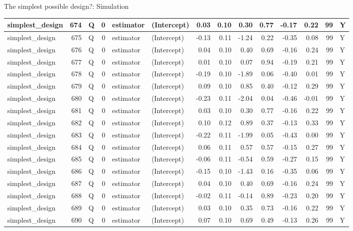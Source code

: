 \documentclass[
  11pt,
  ignorenonframetext,
]{beamer}
\begin{document}
\begin{frame}[fragile]{The simplest possible design?: Simulation}
\begin{tabular}{l|r|l|r|l|l|r|r|r|r|r|r|r|l}
\hline
simplest\_design & 674 & Q & 0 & estimator & (Intercept) & 0.03 & 0.10 & 0.30 & 0.77 & -0.17 & 0.22 & 99 & Y\\
\hline
simplest\_design & 675 & Q & 0 & estimator & (Intercept) & -0.13 & 0.11 & -1.24 & 0.22 & -0.35 & 0.08 & 99 & Y\\
\hline
simplest\_design & 676 & Q & 0 & estimator & (Intercept) & 0.04 & 0.10 & 0.40 & 0.69 & -0.16 & 0.24 & 99 & Y\\
\hline
simplest\_design & 677 & Q & 0 & estimator & (Intercept) & 0.01 & 0.10 & 0.07 & 0.94 & -0.19 & 0.21 & 99 & Y\\
\hline
simplest\_design & 678 & Q & 0 & estimator & (Intercept) & -0.19 & 0.10 & -1.89 & 0.06 & -0.40 & 0.01 & 99 & Y\\
\hline
simplest\_design & 679 & Q & 0 & estimator & (Intercept) & 0.09 & 0.10 & 0.85 & 0.40 & -0.12 & 0.29 & 99 & Y\\
\hline
simplest\_design & 680 & Q & 0 & estimator & (Intercept) & -0.23 & 0.11 & -2.04 & 0.04 & -0.46 & -0.01 & 99 & Y\\
\hline
simplest\_design & 681 & Q & 0 & estimator & (Intercept) & 0.03 & 0.10 & 0.30 & 0.77 & -0.16 & 0.22 & 99 & Y\\
\hline
simplest\_design & 682 & Q & 0 & estimator & (Intercept) & 0.10 & 0.12 & 0.89 & 0.37 & -0.13 & 0.33 & 99 & Y\\
\hline
simplest\_design & 683 & Q & 0 & estimator & (Intercept) & -0.22 & 0.11 & -1.99 & 0.05 & -0.43 & 0.00 & 99 & Y\\
\hline
simplest\_design & 684 & Q & 0 & estimator & (Intercept) & 0.06 & 0.11 & 0.57 & 0.57 & -0.15 & 0.27 & 99 & Y\\
\hline
simplest\_design & 685 & Q & 0 & estimator & (Intercept) & -0.06 & 0.11 & -0.54 & 0.59 & -0.27 & 0.15 & 99 & Y\\
\hline
simplest\_design & 686 & Q & 0 & estimator & (Intercept) & -0.15 & 0.10 & -1.43 & 0.16 & -0.35 & 0.06 & 99 & Y\\
\hline
simplest\_design & 687 & Q & 0 & estimator & (Intercept) & 0.04 & 0.10 & 0.40 & 0.69 & -0.16 & 0.24 & 99 & Y\\
\hline
simplest\_design & 688 & Q & 0 & estimator & (Intercept) & -0.02 & 0.11 & -0.14 & 0.89 & -0.23 & 0.20 & 99 & Y\\
\hline
simplest\_design & 689 & Q & 0 & estimator & (Intercept) & 0.03 & 0.10 & 0.35 & 0.73 & -0.16 & 0.22 & 99 & Y\\
\hline
simplest\_design & 690 & Q & 0 & estimator & (Intercept) & 0.07 & 0.10 & 0.69 & 0.49 & -0.13 & 0.26 & 99 & Y\\

\end{tabular}
\end{frame}
\end{document}
